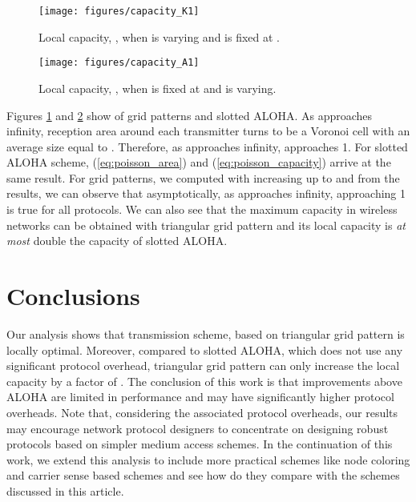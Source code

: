 \documentclass[12pt,english]{article}
\begin{document}
\begin{figure}[!t]
\centering
\texttt{[image: figures/capacity\_K1]}
\caption{Local capacity, , when  is varying and  is fixed at .
\label{fig:comparison1}}
\end{figure}
\begin{figure}[!t]
\centering
\texttt{[image: figures/capacity\_A1]}
\caption{Local capacity, , when  is fixed at  and  is varying.
\label{fig:comparison2}}
\end{figure}

Figures \ref{fig:comparison1} and \ref{fig:comparison2} show  of grid patterns and slotted ALOHA. As  approaches infinity, reception area around each transmitter turns to be a Voronoi cell with an average size equal to . Therefore, as  approaches infinity,  approaches 1. For slotted ALOHA scheme, (\ref{eq:poisson_area}) and (\ref{eq:poisson_capacity}) arrive at the same result. For grid patterns, we computed  with  increasing up to  and from the results, we can observe that asymptotically, as  approaches infinity,  approaching 1 is true for all protocols. We can also see that the maximum capacity in wireless networks can be obtained with triangular grid pattern and its local capacity is {\it at most} double the capacity of slotted ALOHA.

\section{Conclusions}
\label{sec:conclude}

Our analysis shows that transmission scheme, based on triangular grid pattern is locally optimal. Moreover, compared to slotted ALOHA, which does not use any significant protocol overhead, triangular grid pattern can only increase the local capacity by a factor of . The conclusion of this work is that improvements above ALOHA are limited in performance and may have significantly higher protocol overheads. Note that, considering the associated protocol overheads, our results may encourage network protocol designers to concentrate on designing robust protocols based on simpler medium access schemes. In the continuation of this work, we extend this analysis to include more practical schemes like node coloring and carrier sense based schemes and see how do they compare with the schemes discussed in this article. 



\end{document}
